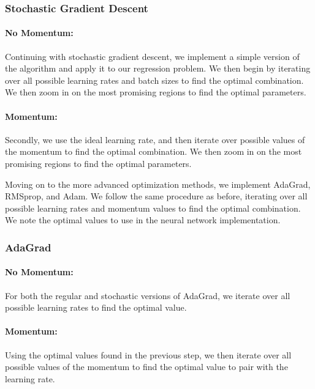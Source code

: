 \subsubsection{Stochastic Gradient Descent}
\paragraph*{No Momentum:}
Continuing with stochastic gradient descent, we implement a simple version of the algorithm and apply it to our regression problem. We then begin by iterating over all possible learning rates and batch sizes to find the optimal combination. We then zoom in on the most promising regions to find the optimal parameters.
\paragraph*{Momentum:}
Secondly, we use the ideal learning rate, and then iterate over possible values of the momentum to find the optimal combination. We then zoom in on the most promising regions to find the optimal parameters.

Moving on to the more advanced optimization methods, we implement AdaGrad, RMSprop, and Adam. We follow the same procedure as before, iterating over all possible learning rates and momentum values to find the optimal combination. We note the optimal values to use in the neural network implementation.

\begin{comment}
  #TODO: Update if we iterate over momentum and rho values as well
\end{comment}

\subsubsection{AdaGrad}
\paragraph{No Momentum:}
For both the regular and stochastic versions of AdaGrad, we iterate over all possible learning rates to find the optimal value.

\paragraph{Momentum:}
Using the optimal values found in the previous step, we then iterate over all possible values of the momentum to find the optimal value to pair with the learning rate.

